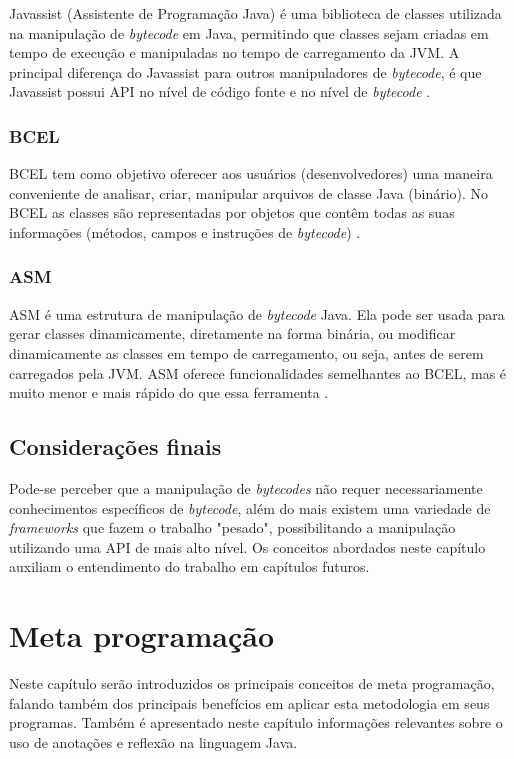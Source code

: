 \documentclass[tc,oneside]{iiufrgs}
\begin{document}
Javassist (Assistente de Programação Java) é uma biblioteca de classes utilizada na manipulação de \textit{bytecode} em Java, permitindo que classes sejam criadas em tempo de execução e manipuladas no tempo de carregamento da JVM. A principal diferença do Javassist para outros manipuladores de \textit{bytecode}, é que Javassist possui  API no nível de código fonte e no nível de \textit{bytecode} \cite{javassist}.
\subsection {BCEL}
BCEL tem como objetivo oferecer aos usuários (desenvolvedores) uma maneira conveniente de analisar, criar, manipular arquivos de classe Java (binário). No BCEL as classes são representadas por objetos que contêm todas as suas informações (métodos, campos e instruções de \textit{bytecode}) \cite{bcel}.
\subsection {ASM}
ASM é uma estrutura de manipulação de \textit{bytecode} Java. Ela pode ser usada para gerar classes dinamicamente, diretamente na forma binária, ou modificar dinamicamente as classes em tempo de carregamento, ou seja, antes de serem carregados pela JVM. ASM oferece funcionalidades semelhantes ao BCEL, mas é muito menor e mais rápido do que essa ferramenta \cite{asmjavasource}.

\section{Considerações finais}

Pode-se perceber que a manipulação de \textit{bytecodes} não requer necessariamente conhecimentos específicos de \textit{bytecode}, além do mais existem uma variedade de \textit{frameworks} que fazem o trabalho "pesado", possibilitando a manipulação utilizando uma API de mais alto nível. Os conceitos abordados neste capítulo auxiliam o entendimento do trabalho em capítulos futuros.

\chapter{Meta programação}
Neste capítulo serão introduzidos  os principais conceitos de meta programação, falando também dos principais benefícios em aplicar esta metodologia em seus programas. Também é apresentado neste capítulo informações relevantes sobre o uso de anotações e reflexão na linguagem Java.
\end{document}
